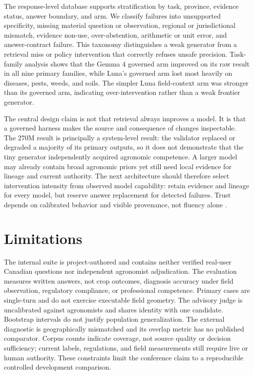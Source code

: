\documentclass[9pt,twocolumn]{article}
\begin{document}
The response-level database supports stratification by task, province, evidence status, answer boundary, and arm. We classify failures into unsupported specificity, missing material question or observation, regional or jurisdictional mismatch, evidence non-use, over-abstention, arithmetic or unit error, and answer-contract failure. This taxonomy distinguishes a weak generator from a retrieval miss or policy intervention that correctly refuses unsafe precision. Task-family analysis shows that the Gemma 4 governed arm improved on its raw result in all nine primary families, while Luna's governed arm lost most heavily on diseases, pests, weeds, and soils. The simpler Luna field-context arm was stronger than its governed arm, indicating over-intervention rather than a weak frontier generator.

The central design claim is not that retrieval always improves a model. It is that a governed harness makes the source and consequence of changes inspectable. The 270M result is principally a system-level result: the validator replaced or degraded a majority of its primary outputs, so it does not demonstrate that the tiny generator independently acquired agronomic competence. A larger model may already contain broad agronomic priors yet still need local evidence for lineage and current authority. The next architecture should therefore select intervention intensity from observed model capability: retain evidence and lineage for every model, but reserve answer replacement for detected failures. Trust depends on calibrated behavior and visible provenance, not fluency alone \citep{lee2004trust}.

\section{Limitations}

The internal suite is project-authored and contains neither verified real-user Canadian questions nor independent agronomist adjudication. The evaluation measures written answers, not crop outcomes, diagnosis accuracy under field observation, regulatory compliance, or professional competence. Primary cases are single-turn and do not exercise executable field geometry. The advisory judge is uncalibrated against agronomists and shares identity with one candidate. Bootstrap intervals do not justify population generalization. The external diagnostic is geographically mismatched and its overlap metric has no published comparator. Corpus counts indicate coverage, not source quality or decision sufficiency; current labels, regulations, and field measurements still require live or human authority. These constraints limit the conference claim to a reproducible controlled development comparison.
\end{document}
